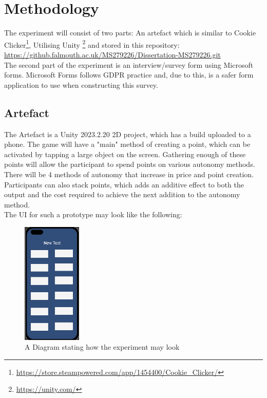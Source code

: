 \documentclass[conference]{IEEEtran}
\begin{document}
\section{Methodology}
 The experiment will consist of two parts: An artefact which is similar to Cookie Clicker\footnote{\url{https://store.steampowered.com/app/1454400/Cookie_Clicker/}}, Utilising Unity \footnote{\url{https://unity.com/}} and stored in this repository:\\

\url{https://github.falmouth.ac.uk/MS279226/Dissertation-MS279226.git}\\

The second part of the experiment is an interview/survey form using Microsoft forms. Microsoft Forms follows GDPR practice and, due to this, is a safer form application to use when constructing this survey.

\subsection{Artefact}
The Artefact is a Unity 2023.2.20 2D project, which has a build uploaded to a phone. The game will have a "main" method of creating a point, which can be activated by tapping a large object on the screen. Gathering enough of these points will allow the participant to spend points on various autonomy methods. There will be 4 methods of autonomy that increase in price and point creation. Participants can also stack points, which adds an additive effect to both the output and the cost required to achieve the next addition to the autonomy method.\\

The UI for such a prototype may look like the following:

\begin{figure}[H]
\begin{center}
\includegraphics[width = 0.25\textwidth, ]{Sim1}
\caption{A Diagram stating how the experiment may look}
\label{tab:figure1}
\end{center}
\end{figure}
\end{document}
